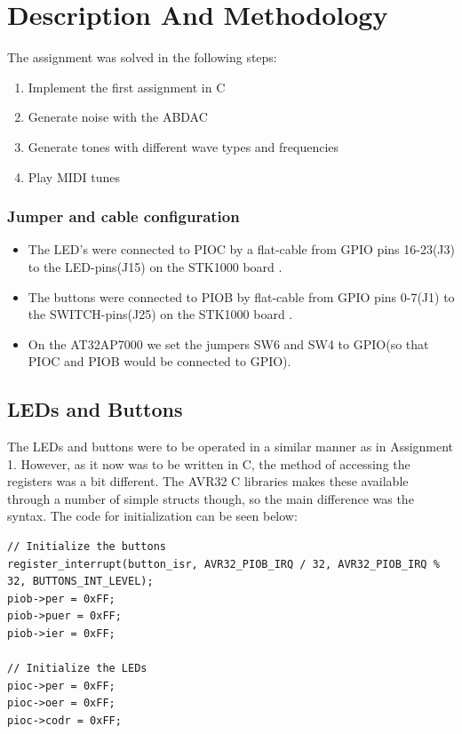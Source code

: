 \documentclass[a4paper,12pt]{article}
\begin{document}
\clearpage
\section{Description And Methodology}

The assignment was solved in the following steps:
\begin{enumerate}
\item Implement the first assignment in C
\item Generate noise with the ABDAC
\item Generate tones with different wave types and frequencies
\item Play MIDI tunes
\end{enumerate} 

\subsubsection*{Jumper and cable configuration}
\begin{itemize}
\item The LED’s were connected to PIOC by a flat-cable from GPIO pins 16-23(J3) to the LED-pins(J15) on the STK1000 board \cite[section~2.4.1]{compendium}.
\item The buttons were connected to PIOB by flat-cable from GPIO pins 0-7(J1) to the SWITCH-pins(J25) on the STK1000 board \cite[section~2.4.1]{compendium}.
\item On the AT32AP7000 we set the jumpers SW6 and SW4 to GPIO(so that PIOC and PIOB would be connected to GPIO)\cite[table~2.3]{compendium}.
\end{itemize}

\subsection{LEDs and Buttons}

The LEDs and buttons were to be operated in a similar manner as in Assignment 1. However, as it now was to be written in C, the method of accessing the registers was a bit different. The AVR32 C libraries makes these available through a number of simple structs though, so the main difference was the syntax. The code for initialization can be seen below:

\begin{verbatim}
// Initialize the buttons
register_interrupt(button_isr, AVR32_PIOB_IRQ / 32, AVR32_PIOB_IRQ % 32, BUTTONS_INT_LEVEL);
piob->per = 0xFF;
piob->puer = 0xFF;
piob->ier = 0xFF;

// Initialize the LEDs
pioc->per = 0xFF;
pioc->oer = 0xFF;
pioc->codr = 0xFF;
\end{verbatim}
\end{document}
